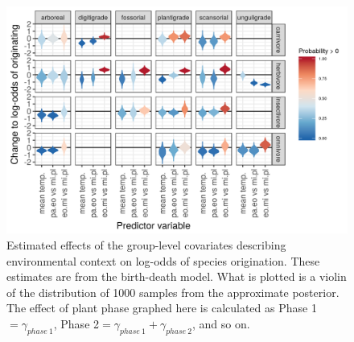 \documentclass[12pt,letterpaper]{article}
\begin{document}
\begin{figure}[ht]
  \centering
  \includegraphics[width=\textwidth,height=0.4\textheight,keepaspectratio=true]{figure/group_on_origin_bd}
  \caption[Effects of group-level covariates on log-odds of ecotype origination as estimated from the birth-death model]{Estimated effects of the group-level covariates describing environmental context on log-odds of species origination. These estimates are from the birth-death model. What is plotted is a violin of the distribution of 1000 samples from the approximate posterior. The effect of plant phase graphed here is calculated as Phase 1\( = \gamma_{phase\ 1}\), Phase 2\( = \gamma_{phase\ 1} + \gamma_{phase\ 2}\), and so on.} 
  \label{fig:group_origin_bd}
\end{figure}
\end{document}

